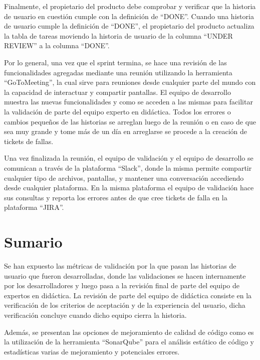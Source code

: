 Finalmente, el propietario del producto debe comprobar y verificar que la historia de usuario en cuestión cumple con la definición de \enquote{DONE}. Cuando una historia de usuario cumple la definición de \enquote{DONE}, el propietario del producto actualiza la tabla de tareas moviendo la historia de usuario de la columna \enquote{UNDER REVIEW} a la columna \enquote{DONE}.

Por lo general, una vez que el sprint termina, se hace una revisión de las funcionalidades agregadas mediante una reunión utilizando la herramienta \enquote{GoToMeeting}, la cual sirve para reuniones desde cualquier parte del mundo con la capacidad de interactuar y compartir pantallas. El equipo de desarrollo muestra las nuevas funcionalidades y como se acceden a las mismas para facilitar la validación de parte del equipo experto en didáctica. Todos los errores o cambios pequeños de las historias se arreglan luego de la reunión o en caso de que sea muy grande y tome más de un día en arreglarse se procede a la creación de tickets de fallas.

Una vez finalizada la reunión, el equipo de validación y el equipo de desarrollo se comunican a través de la plataforma \enquote{Slack}, donde la misma permite compartir cualquier tipo de archivos, pantallas, y mantener una conversación accediendo desde cualquier plataforma. En la misma plataforma el equipo de validación hace sus consultas y reporta los errores antes de que cree tickets de falla en la plataforma \enquote{JIRA}.

\section{Sumario}
Se han expuesto las métricas de validación por la que pasan las historias de usuario que fueron desarrolladas, donde las validaciones se hacen internamente por los desarrolladores y luego pasa a la revisión final de parte del equipo de expertos en didáctica. La revisión de parte del equipo de didáctica consiste en la verificación de los criterios de aceptación y de la experiencia del usuario, dicha verificación concluye cuando dicho equipo cierra la historia.

Además, se presentan las opciones de mejoramiento de calidad de código como es la utilización de la herramienta \enquote{SonarQube} para el análisis estático de código y estadísticas varias de mejoramiento y potenciales errores.